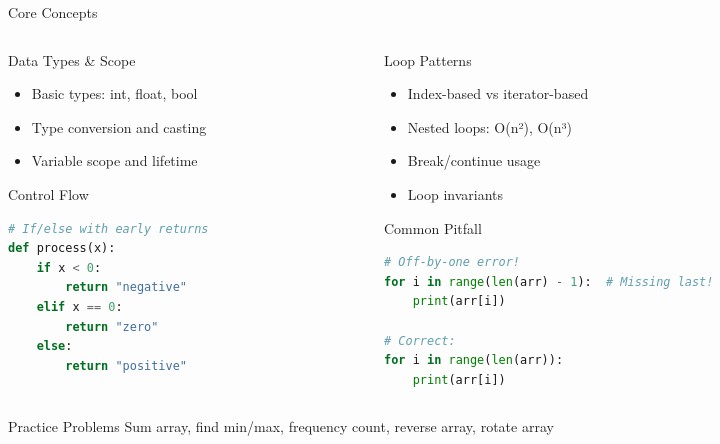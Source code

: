 \documentclass[aspectratio=169,xcolor=dvipsnames]{beamer}
\begin{document}
\begin{frame}[fragile]{Core Concepts}
  \begin{columns}
    \begin{column}{0.48\textwidth}
      \begin{block}{Data Types \& Scope}
        \begin{itemize}
          \item Basic types: int, float, bool
          \item Type conversion and casting
          \item Variable scope and lifetime
        \end{itemize}
      \end{block}

      \vspace{0.2cm}

      \begin{exampleblock}{Control Flow}
        \begin{lstlisting}[language=Python,basicstyle=\tiny\ttfamily]
# If/else with early returns
def process(x):
    if x < 0:
        return "negative"
    elif x == 0:
        return "zero"
    else:
        return "positive"
        \end{lstlisting}
      \end{exampleblock}
    \end{column}
    \begin{column}{0.48\textwidth}
      \begin{block}{Loop Patterns}
        \begin{itemize}
          \item Index-based vs iterator-based
          \item Nested loops: O(n²), O(n³)
          \item Break/continue usage
          \item Loop invariants
        \end{itemize}
      \end{block}

      \vspace{0.2cm}

      \begin{exampleblock}{Common Pitfall}
        \begin{lstlisting}[language=Python,basicstyle=\tiny\ttfamily]
# Off-by-one error!
for i in range(len(arr) - 1):  # Missing last!
    print(arr[i])

# Correct:
for i in range(len(arr)):
    print(arr[i])
        \end{lstlisting}
      \end{exampleblock}
    \end{column}
  \end{columns}

  \vspace{0.3cm}

  \begin{alertblock}{Practice Problems}
    Sum array, find min/max, frequency count, reverse array, rotate array
  \end{alertblock}
\end{frame}
\end{document}
